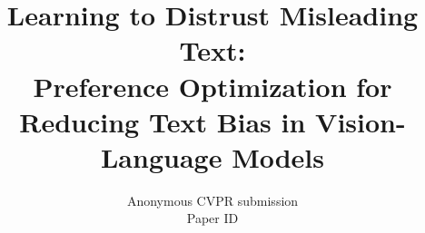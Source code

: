 \documentclass[10pt,twocolumn,letterpaper]{article}
\title{Learning to Distrust Misleading Text:\\
Preference Optimization for Reducing Text Bias in Vision-Language Models}
\author{Anonymous CVPR submission\\
Paper ID \paperID}
\begin{document}
\maketitle









{
    \small
    
    
}
\end{document}
